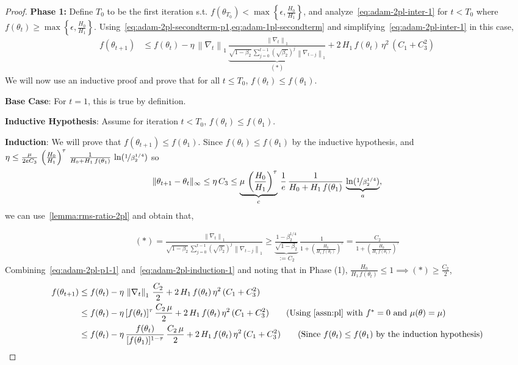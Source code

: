 \documentclass{article}
\newcommand{\norm}[1]{\left\|#1 \right\|}
\newcommand{\tht}{\theta_t}
\newcommand{\thtt}{\theta_{t+1}}
\begin{document}
\begin{proof}
\textbf{Phase 1:} Define $T_0$ to be the first iteration s.t. $f(\theta_{T_0}) < \max\left\{\epsilon, \frac{H_0}{H_1} \right\}$, and analyze~\cref{eq:adam-2pl-inter-1} for $t < T_0$ where $f(\tht) \geq \max\left\{\epsilon, \frac{H_0}{H_1} \right\}$. Using~\cref{eq:adam-2pl-secondterm-p1,eq:adam-1pl-secondterm} and simplifying~\cref{eq:adam-2pl-inter-1} in this case, 
\begin{align}
f(\thtt) & \leq f(\tht) - \eta \, \norm{\nabla_t}_1 \, \underbrace{\frac{\norm{\nabla_t}_1}{\sqrt{1 - \beta_2} \, \sum_{j = 0}^{t-1} (\sqrt{\beta_2})^{j} \, \norm{\nabla_{t-j}}_1}}_{(*)} + 2 \, H_1 \, f(\tht)  \, \eta^2 \, (C_1+ C^2_3)     \label{eq:adam-2pl-p1-1}
\end{align}
We will now use an inductive proof and prove that for all $t \leq T_0$, $f(\tht) \leq f(\theta_1)$. 

\textbf{Base Case}: For $t = 1$, this is true by definition. 

\textbf{Inductive Hypothesis}: Assume for iteration $t < T_0$, $f(\tht) \leq f(\theta_1)$.

\textbf{Induction}:  We will prove that $f(\thtt) \leq f(\theta_1)$. Since $f(\tht) \leq f(\theta_1)$ by the inductive hypothesis, and $\eta \leq \frac{\mu   }{2 e C_3} \, \left(\frac{H_0}{H_1}\right)^\tau \, \frac{1}{H_0 + H_1 \, f(\theta_1)} \, \ln(\nicefrac{1}{\beta_2^{1/4}})$
so
\[
\|\theta_{t+1}-\theta_{t}\|_\infty \leq  \eta \, C_3 \leq \underbrace{\mu  \, \left(\frac{H_0}{H_1}\right)^\tau}_{c} \,\frac{1}{e}\, \frac{1}{H_0 + H_1 \, f(\theta_1)} \, \underbrace{\ln(\nicefrac{1}{\beta_2^{1/4}})}_{a},  
\]
 we can use~\cref{lemma:rms-ratio-2pl} and obtain that, 

\begin{align}
(*) = \frac{\norm{\nabla_t}_1}{\sqrt{1 - \beta_2} \, \sum_{j = 0}^{t-1} (\sqrt{\beta_2})^{j} \, \norm{\nabla_{t-j}}_1} \geq \underbrace{\frac{1 - \beta_2^{1/4}}{\sqrt{1 - \beta_2}}}_{:= C_2} \, \frac{1}{1 + \left( \frac{H_0}{H_1 \, f(\tht)} \right)^{\tau} }  = \frac{C_2}{1 + \left( \frac{H_0}{H_1 \, f(\tht)} \right)^{\tau} }  \label{eq:adam-2pl-induction-1}
\end{align}
Combining~\cref{eq:adam-2pl-p1-1} and~\cref{eq:adam-2pl-induction-1} and noting that in Phase (1), $\frac{H_0}{H_1 \, f(\tht)} \leq 1 \implies (*) \geq \frac{C_2}{2}$,
\begin{align*}
f(\thtt) & \leq f(\tht) - \eta \, \norm{\nabla_t}_1 \, \frac{C_2}{2} + 2 \, H_1 \, f(\tht)  \, \eta^2 \, (C_1+ C^2_3) \\
& \leq f(\tht) - \eta \, [f(\tht)]^\tau \, \frac{C_2 \, \mu}{2} + 2 \, H_1 \, f(\tht)  \, \eta^2 \, (C_1+ C^2_3) 
\tag{Using~\cref{assn:pl} with $f^* = 0$ and $\mu(\theta) = \mu$} \\
& \leq f(\tht) - \eta \, \frac{f(\tht)}{[f(\theta_1)]^{1-\tau}} \, \frac{C_2 \, \mu}{2}+ 2 \, H_1 \, f(\tht)  \, \eta^2 \, (C_1+ C^2_3) \tag{Since $f(\tht) \leq f(\theta_1)$ by the induction hypothesis}
\end{align*}


\end{proof}
\end{document}
